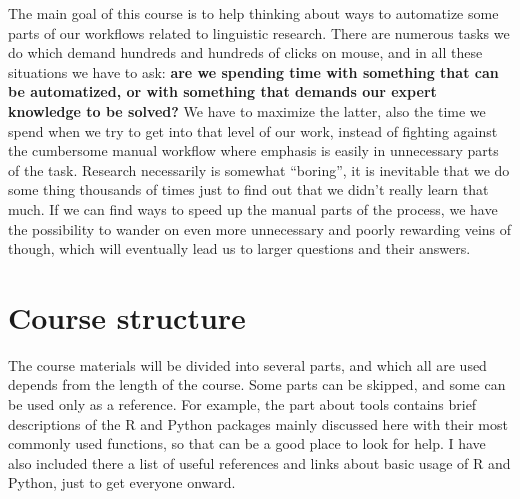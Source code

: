 \documentclass[]{book}
\theoremstyle{definition}
\theoremstyle{definition}
\theoremstyle{definition}
\theoremstyle{remark}
\begin{document}
The main goal of this course is to help thinking about ways to
automatize some parts of our workflows related to linguistic research.
There are numerous tasks we do which demand hundreds and hundreds of
clicks on mouse, and in all these situations we have to ask: \textbf{are
we spending time with something that can be automatized, or with
something that demands our expert knowledge to be solved?} We have to
maximize the latter, also the time we spend when we try to get into that
level of our work, instead of fighting against the cumbersome manual
workflow where emphasis is easily in unnecessary parts of the task.
Research necessarily is somewhat ``boring'', it is inevitable that we do
some thing thousands of times just to find out that we didn't really
learn that much. If we can find ways to speed up the manual parts of the
process, we have the possibility to wander on even more unnecessary and
poorly rewarding veins of though, which will eventually lead us to
larger questions and their answers.

\section{Course structure}\label{course-structure}

The course materials will be divided into several parts, and which all
are used depends from the length of the course. Some parts can be
skipped, and some can be used only as a reference. For example, the part
about tools contains brief descriptions of the R and Python packages
mainly discussed here with their most commonly used functions, so that
can be a good place to look for help. I have also included there a list
of useful references and links about basic usage of R and Python, just
to get everyone onward.
\end{document}
